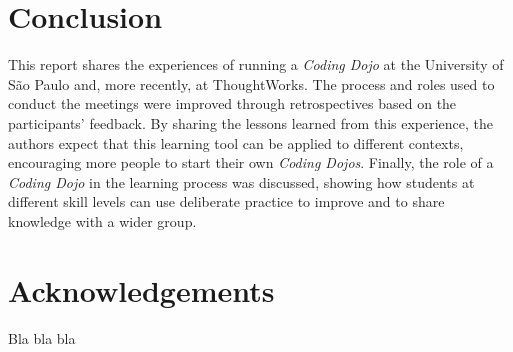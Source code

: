 \section{Conclusion}\label{sec:conclusion}

This report shares the experiences of running a \emph{Coding Dojo} at the University of São Paulo and, more
recently, at ThoughtWorks. The process and roles used to conduct the meetings were improved through
retrospectives based on the participants' feedback. By sharing the lessons learned from this experience, the
authors expect that this learning tool can be applied to different contexts, encouraging more people to
start their own \emph{Coding Dojos}. Finally, the role of a \emph{Coding Dojo} in the learning process
was discussed, showing how students at different skill levels can use deliberate practice to improve and to
share knowledge with a wider group.

\section*{Acknowledgements}

Bla bla bla
